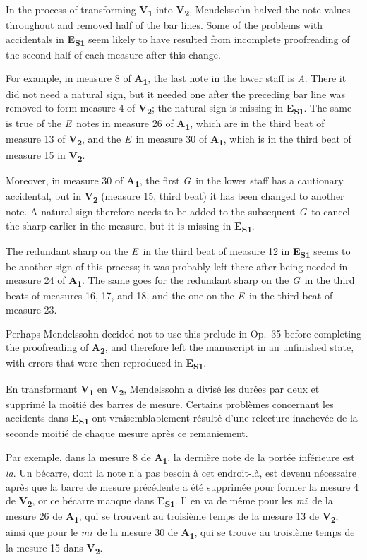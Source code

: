 \documentclass[a4paper, 12pt]{book}
\newcommand{\source}[2]{\textbf{#1\textsubscript{#2}}}
\newcommand{\bigdot}[0]{{\Large \textbullet}}
\newcommand{\centerbigdot}[0]{\begin{center}\bigdot\end{center}}
\begin{document}
{    In the process of transforming \source{V}{1} into \source{V}{2},
    Mendelssohn halved the note values throughout and removed half of
    the bar lines. Some of the problems with accidentals in
    \source{E}{S1} seem likely to have resulted from incomplete
    proofreading of the second half of each measure after this change.

    For example, in measure 8 of \source{A}{1}, the last note in the
    lower staff is \textit{A}\na. There it did not need a natural
    sign, but it needed one after the preceding bar line was removed
    to form measure 4 of \source{V}{2}; the natural sign is missing in
    \source{E}{S1}. The same is true of the \textit{E}\na\ notes in
    measure 26 of \source{A}{1}, which are in the third beat of
    measure 13 of \source{V}{2}, and the \textit{E}\na\ in measure 30
    of \source{A}{1}, which is in the third beat of measure 15 in
    \source{V}{2}.
    
    Moreover, in measure 30 of \source{A}{1}, the first
    \textit{G}\na\ in the lower staff has a cautionary accidental, but
    in \source{V}{2} (measure 15, third beat) it has been changed to
    another note. A natural sign therefore needs to be added to the
    subsequent \textit{G}\na\ to cancel the sharp earlier in the
    measure, but it is missing in \source{E}{S1}.

    The redundant sharp on the \textit{E}\sh\ in the third beat of
    measure 12 in \source{E}{S1} seems to be another sign of this
    process; it was probably left there after being needed in measure
    24 of \source{A}{1}. The same goes for the redundant sharp on the
    \textit{G}\sh\ in the third beats of measures 16, 17, and 18, and
    the one on the \textit{E}\sh\ in the third beat of measure 23.

    Perhaps Mendelssohn decided not to use this prelude in Op.\ 35
    before completing the proofreading of \source{A}{2}, and therefore
    left the manuscript in an unfinished state, with errors that were
    then reproduced in \source{E}{S1}.

    \centerbigdot

    En transformant \source{V}{1} en \source{V}{2}, Mendelssohn a
    divisé les durées par deux et supprimé la moitié des barres de
    mesure. Certains problèmes concernant les accidents dans
    \source{E}{S1} ont vraisemblablement résulté d'une relecture
    inachevée de la seconde moitié de chaque mesure après ce
    remaniement.

    Par exemple, dans la mesure 8 de \source{A}{1}, la dernière note
    de la portée inférieure est \textit{la}\na. Un bécarre, dont la
    note n'a pas besoin à cet endroit-là, est devenu nécessaire après
    que la barre de mesure précédente a été supprimée pour former la
    mesure 4 de \source{V}{2}, or ce bécarre manque dans
    \source{E}{S1}. Il en va de même pour les \textit{mi}\na\ de la
    mesure 26 de \source{A}{1}, qui se trouvent au troisième temps de
    la mesure 13 de \source{V}{2}, ainsi que pour le \textit{mi}\na\ de la
    mesure 30 de \source{A}{1}, qui se trouve au troisième temps de la
    mesure 15 dans \source{V}{2}.

}
\end{document}
